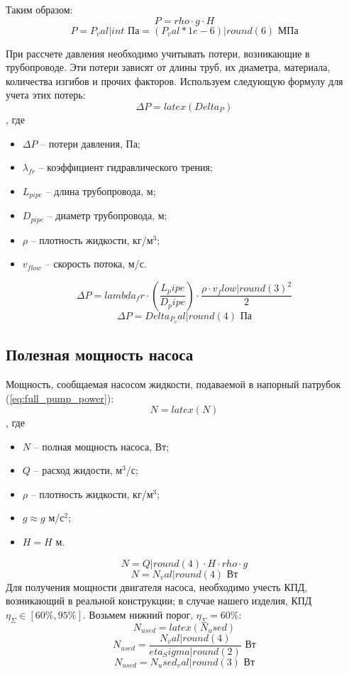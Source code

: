 \documentclass[12pt]{extarticle}
\begin{document}
Таким образом:
$$
P = {{rho}} \cdot {{g}} \cdot {{H}}
$$
$$
P = {{ P_val | int }} \text{ Па} = {{ (P_val * 1e-6) | round(6)}} \text{ МПа}
$$

При рассчете давления необходимо учитывать потери, возникающие в трубопроводе. Эти потери зависят от длины труб, их диаметра,
материала, количества изгибов и прочих факторов. Используем следующую формулу для учета этих потерь:
\begin{equation}
    \Delta P = {{latex(Delta_P) }}
    \label{eq:pipe_loss}
\end{equation}
, где
\begin{itemize}
    \item $\Delta P$ -- потери давления, Па;
    \item $\lambda_{fr}$ -- коэффициент гидравлического трения;
    \item $L_{pipe}$ -- длина трубопровода, м;
    \item $D_{pipe}$ -- диаметр трубопровода, м;
    \item $\rho$ -- плотность жидкости, кг/$\text{м}^3$;
    \item $v_{flow}$ -- скорость потока, м/с.
\end{itemize}

$$
\Delta P = {{lambda_fr}} \cdot \left(\frac{ {{ L_pipe }} }{ {{ D_pipe }} } \right) \cdot \frac{\rho \cdot {{ v_flow | round(3) }}^{2}}{2}
$$
$$
\Delta P = {{Delta_P_val | round(4)}} \text{ Па}
$$

\subsection{Полезная мощность насоса}
Мощность, сообщаемая насосом жидкости, подаваемой в напорный патрубок (\ref{eq:full_pump_power}):
\begin{equation}
    N = {{ latex(N) }}
    \label{eq:full_pump_power}
\end{equation}
, где
\begin{itemize}
    \item $N$ -- полная мощность насоса, Вт;
    \item $Q$ -- расход жидости, $\text{м}^3$/с;
    \item $\rho$ -- плотность жидкости, кг/$\text{м}^3$;
    \item $g \approx {{g}}$ м/$\text{с}^2$;
    \item $H = {{H}}$ м.
\end{itemize}
$$
N = {{ Q | round(4) }} \cdot {{ H }} \cdot {{ rho }} \cdot {{ g }}
$$
$$
N = {{ N_val | round(4)}} \text{ Вт}
$$
Для получения мощности двигателя насоса, необходимо учесть КПД, возникающий в реальной конструкции;
в случае нашего изделия, КПД $\eta_{\Sigma} \in \left[ 60\%, 95\% \right]$. Возьмем нижний порог,
$\eta_{\Sigma} = 60\%$:
\begin{equation}
    N_{used} = {{ latex(N_used) }}
    \label{eq:pump_force}
\end{equation}
$$
N_{used} = \frac{ {{ N_val | round(4) }} }{ {{eta_Sigma | round(2)}} } \text{ Вт}
$$
$$
N_{used} = {{N_used_val | round(3)}} \text{ Вт}
$$
\end{document}
